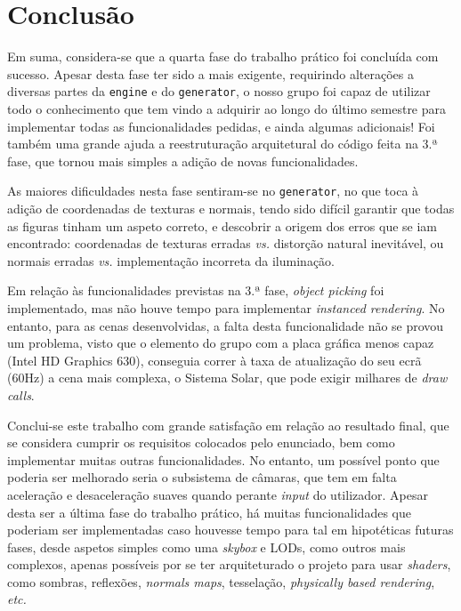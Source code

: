 \documentclass[12pt, a4paper]{article}
\begin{document}
\section{Conclusão}

Em suma, considera-se que a quarta fase do trabalho prático foi concluída com sucesso. Apesar desta
fase ter sido a mais exigente, requirindo alterações a diversas partes da \texttt{engine} e do
\texttt{generator}, o nosso grupo foi capaz de utilizar todo o conhecimento que tem vindo a adquirir
ao longo do último semestre para implementar todas as funcionalidades pedidas, e ainda algumas
adicionais! Foi também uma grande ajuda a reestruturação arquitetural do código feita na 3.ª fase,
que tornou mais simples a adição de novas funcionalidades.

As maiores dificuldades nesta fase sentiram-se no \texttt{generator}, no que toca à adição de
coordenadas de texturas e normais, tendo sido difícil garantir que todas as figuras tinham um aspeto
correto, e descobrir a origem dos erros que se iam encontrado: coordenadas de texturas erradas
\emph{vs.} distorção natural inevitável, ou normais erradas \emph{vs.} implementação incorreta da
iluminação.

Em relação às funcionalidades previstas na 3.ª fase, \emph{object picking} foi implementado, mas não
houve tempo para implementar \emph{instanced rendering}. No entanto, para as cenas desenvolvidas, a
falta desta funcionalidade não se provou um problema, visto que o elemento do grupo com a placa
gráfica menos capaz (Intel HD Graphics 630), conseguia correr à taxa de atualização do seu ecrã
(60Hz) a cena mais complexa, o Sistema Solar, que pode exigir milhares de \emph{draw calls}.

Conclui-se este trabalho com grande satisfação em relação ao resultado final, que se considera
cumprir os requisitos colocados pelo enunciado, bem como implementar muitas outras funcionalidades.
No entanto, um possível ponto que poderia ser melhorado seria o subsistema de câmaras, que tem em
falta aceleração e desaceleração suaves quando perante \emph{input} do utilizador. Apesar desta ser
a última fase do trabalho prático, há muitas funcionalidades que poderiam ser implementadas caso
houvesse tempo para tal em hipotéticas futuras fases, desde aspetos simples como uma \emph{skybox} e
LODs, como outros mais complexos, apenas possíveis por se ter arquiteturado o projeto para usar
\emph{shaders}, como sombras, reflexões, \emph{normals maps}, tesselação, \emph{physically based
rendering}, \emph{etc.}
\end{document}
